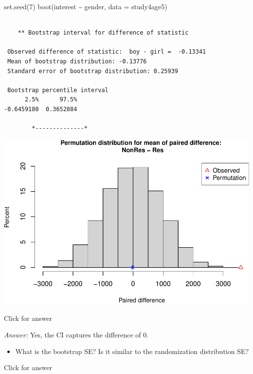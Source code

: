 \documentclass[
]{book}
\newenvironment{Shaded}{\begin{snugshade}}{\end{snugshade}}
\newcommand{\AttributeTok}[1]{\textcolor[rgb]{0.77,0.63,0.00}{#1}}
\newcommand{\DecValTok}[1]{\textcolor[rgb]{0.00,0.00,0.81}{#1}}
\newcommand{\FunctionTok}[1]{\textcolor[rgb]{0.00,0.00,0.00}{#1}}
\newcommand{\NormalTok}[1]{#1}
\newcommand{\SpecialCharTok}[1]{\textcolor[rgb]{0.00,0.00,0.00}{#1}}
\providecommand{\tightlist}{%
  \setlength{\itemsep}{0pt}\setlength{\parskip}{0pt}}
\begin{document}
\begin{Shaded}
\begin{Highlighting}[]
\FunctionTok{set.seed}\NormalTok{(}\DecValTok{7}\NormalTok{)}
\FunctionTok{boot}\NormalTok{(interest }\SpecialCharTok{\textasciitilde{}}\NormalTok{ gender, }\AttributeTok{data =}\NormalTok{ study4age5)}
\end{Highlighting}
\end{Shaded}

\begin{verbatim}

    ** Bootstrap interval for difference of statistic

 Observed difference of statistic:  boy - girl =  -0.13341 
 Mean of bootstrap distribution: -0.13776 
 Standard error of bootstrap distribution: 0.25939 

 Bootstrap percentile interval
      2.5%      97.5% 
-0.6459180  0.3652884 

        *--------------*
\end{verbatim}

\includegraphics[width=1\linewidth]{Class_Activity_13_files/figure-latex/unnamed-chunk-5-1}

Click for answer

\emph{Answer:} Yes, the CI captures the difference of 0.

\begin{itemize}
\tightlist
\item
  What is the bootstrap SE? Is it similar to the randomization distribution SE?
  \vspace*{.5in}
\end{itemize}

Click for answer
\end{document}
